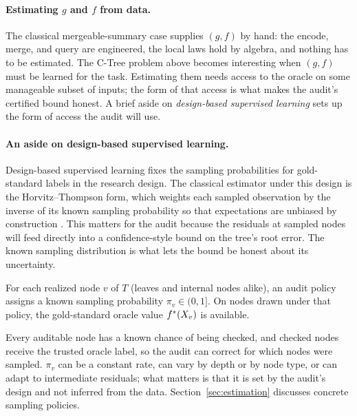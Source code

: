 \paragraph{Estimating \(g\) and \(f\) from data.}
The classical mergeable-summary case supplies \((g,f)\) by hand: the
encode, merge, and query are engineered, the local laws hold by
algebra, and nothing has to be estimated. The C-Tree problem above
becomes interesting when \((g,f)\) must be learned for the task.
Estimating them needs access to the oracle on some manageable subset
of inputs; the form of that access is what makes the audit's certified
bound honest. A brief aside on \emph{design-based supervised learning}
sets up the form of access the audit will use.

\paragraph{An aside on design-based supervised learning.}
Design-based supervised learning fixes the sampling probabilities for
gold-standard labels in the research design. The classical estimator
under this design is the Horvitz--Thompson form, which weights each
sampled observation by the inverse of its known sampling probability
so that expectations are unbiased by construction
\citep{HorvitzThompson1952,SarndalEtAl1992,EgamiEtAl2024}.
This matters for the audit because the residuals at sampled nodes will
feed directly into a confidence-style bound on the tree's root error.
The known sampling distribution is what lets the bound be honest about
its uncertainty.

\begin{assumption}
\label{ass:v7-dsl}
For each realized node \(v\) of \(T\) (leaves and internal nodes
alike), an audit policy assigns a known sampling probability
\(\pi_v\in(0,1]\). On nodes drawn under that policy, the
gold-standard oracle value \(f^\ast(X_v)\) is available.
\end{assumption}

Every auditable node has a known chance of being checked, and
checked nodes receive the trusted oracle label, so the audit can
correct for which nodes were sampled. \(\pi_v\) can be a constant
rate, can vary by depth or by node type, or can adapt to intermediate
residuals; what matters is that it is set by the audit's design and
not inferred from the data. Section~\ref{sec:estimation}
discusses concrete sampling policies.

